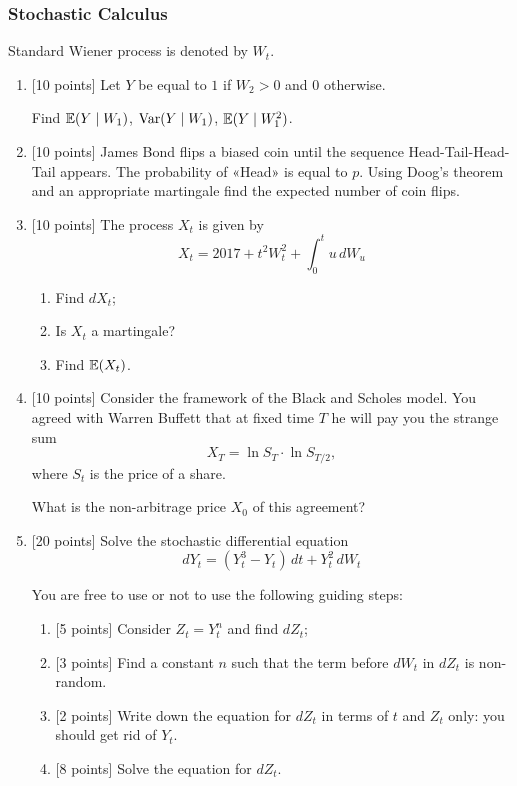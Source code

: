 \documentclass[12pt, a4paper]{article}
\begin{document}
\subsubsection{Stochastic Calculus}

Standard Wiener process is denoted by $W_t$.

\begin{enumerate}
  \item {[10 points]} Let $Y$ be equal to $1$ if $W_2>0$ and $0$ otherwise.

  Find $\operatorname{\mathbb{E}}(Y \mid W_1)$, $\operatorname{Var}(Y \mid W_1)$, $\operatorname{\mathbb{E}}(Y \mid W_1^2)$.
  \item {[10 points]} James Bond flips a biased coin until the sequence Head-Tail-Head-Tail appears. The probability of «Head» is equal to $p$. Using Doog's theorem and an appropriate martingale find the expected number of coin flips.
  \item {[10 points]} The process $X_t$ is given by
  \[
    X_t = 2017 + t^2 W_t^2 + \int_0^t u \, dW_u
  \]
  \begin{enumerate}
    \item Find $dX_t$;
    \item Is $X_t$ a martingale?
    \item Find $\operatorname{\mathbb{E}}(X_t)$.
  \end{enumerate}

  \item {[10 points]} Consider the framework of the Black and Scholes model. You agreed with Warren Buffett that at fixed time $T$ he will pay you the strange sum
  \[
  X_T = \ln S_T \cdot \ln S_{T/2},
  \]
where $S_t$ is the price of a share.

What is the non-arbitrage price $X_0$ of this agreement?
  \item {[20 points]} Solve the stochastic differential equation
  \[
  dY_t =(Y_t^3 - Y_t) \, dt + Y_t^2 \, dW_t
  \]

  You are free to use or not to use the following guiding steps:

  \begin{enumerate}
    \item {[5 points]} Consider $Z_t = Y_t^n$ and find $dZ_t$;
    \item {[3 points]} Find a constant $n$ such that the term before $dW_t$ in $dZ_t$ is non-random.
    \item {[2 points]} Write down the equation for $dZ_t$ in terms of $t$ and $Z_t$ only: you should get rid of $Y_t$.
    \item {[8 points]} Solve the equation for $dZ_t$.


\end{enumerate}
\end{enumerate}
\end{document}
